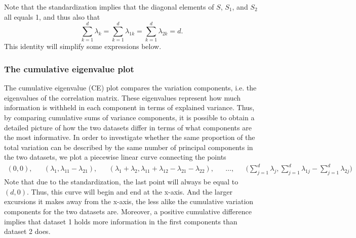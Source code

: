 \documentclass[titlepage,11pt,twoside]{article}
\begin{document}
Note that the standardization implies that the diagonal elements of $S$, $S_1$, and $S_2$ all equals 1, and thus also that
\begin{equation*}
\sum_{k=1}^d \lambda_k = \sum_{k=1}^d \lambda_{1k} = \sum_{k=1}^d \lambda_{2k} =  d.
\end{equation*}
This identity will simplify some expressions below.

\subsubsection{The cumulative eigenvalue plot}
The cumulative eigenvalue (CE) plot compares the variation components, i.e. the eigenvalues of the correlation matrix. These eigenvalues represent how much information is withheld in each component in terms of explained variance. Thus, by comparing cumulative sums of variance components, it is possible to obtain a detailed picture of how the two datasets differ in terms of what components are the most informative. 
In order to investigate whether the same proportion of the total variation can be described by the same number of principal components in the two datasets, we plot a piecewise linear curve connecting the points
\begin{align*}
(0,0), &&
(\lambda_1,\lambda_{11}-\lambda_{21}), &&
(\lambda_1 + \lambda_2,\lambda_{11}+\lambda_{12}-\lambda_{21}-\lambda_{22}), &&
\ldots, &&
\bigg( \sum_{j=1}^d \lambda_j, \sum_{j=1}^d \lambda_{1j} - \sum_{j=1}^d \lambda_{2j} \bigg)
\end{align*}
Note that due to the standardization, the last point will always be equal to $(d,0)$. Thus, this curve will begin and end at the x-axis. And the larger excursions it makes away from the x-axis, the less alike the cumulative variation components for the two datasets are. Moreover, a positive cumulative difference implies that dataset 1 holds more information in the first components than dataset 2 does.
\end{document}
